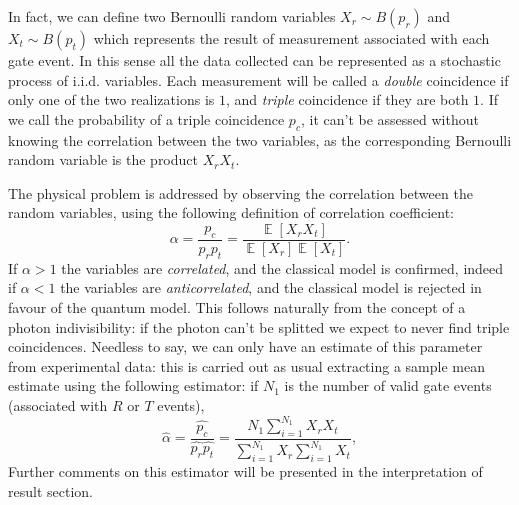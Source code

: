 \documentclass[10pt, final]{article}
\DeclareMathOperator{\E}{\mathbb{E}}
\begin{document}
\begin{multicols}{2}
In fact, we can define two Bernoulli random variables $X_r \sim B(p_r)$ and $X_t \sim B(p_t)$ which represents the result of measurement associated with each gate event. In this sense all the data collected can be represented as a stochastic process of i.i.d. variables. Each measurement will be called a \emph{double} coincidence if only one of the two realizations is $1$, and \emph{triple} coincidence if they are both $1$. 
If we call the probability of a triple coincidence $p_c$, it can't be assessed without knowing the correlation between the two variables, as the corresponding Bernoulli random variable is the product $X_r X_t$.

The physical problem is addressed by observing the correlation between the random variables, using the following definition of correlation coefficient: 
\begin{equation*}
    \alpha = \frac{p_c}{p_r p_t} = \frac{\E[X_r X_t]}{\E[X_r]\E[X_t]}.
\end{equation*}
If $\alpha > 1$ the variables are \emph{correlated}, and the classical model is confirmed, indeed if $\alpha < 1$ the variables are \emph{anticorrelated}, and the classical model is rejected in favour of the quantum model. This follows naturally from the concept of a photon indivisibility: if the photon can't be splitted we expect to never find triple coincidences.
Needless to say, we can only have an estimate of this parameter from experimental data: this is carried out as usual extracting a sample mean estimate using the following estimator: if $N_1$ is the number of valid gate events (associated with $R$ or $T$ events),
\begin{equation*}
    \hat{\alpha} = \frac{\hat{p_c}}{\hat{p_r} \hat{p_t}} = \frac{N_1 \sum_{i=1}^{N_1} X_r X_t}{\sum_{i=1}^{N_1} X_r\sum_{i=1}^{N_1} X_t},
\end{equation*}
Further comments on this estimator will be presented in the interpretation of result section.

\end{multicols}
\end{document}
